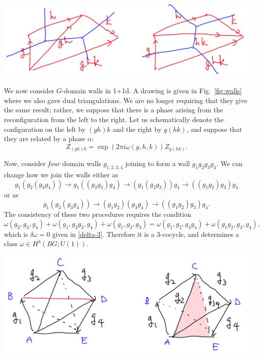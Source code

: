 \documentclass[12pt]{article}
\numberwithin{equation}{section}
\numberwithin{figure}{section}
\theoremstyle{remark}
\renewenvironment{figure}[1][]{
  \begin{originalfigure}[#1]
    \begin{mdframed}[linecolor=black!0,backgroundcolor=black!1]
}{
    \end{mdframed}
  \end{originalfigure}
}
\begin{document}
\begin{figure}
\centering
 \includegraphics[scale=.2]{walls.png} 
\caption{Reconfiguring $G$ domain walls in 1+1d. \label{fig:walls}}
\end{figure}

We now consider $G$-domain walls in 1+1d.
A drawing is given in Fig.~\ref{fig:walls} where we also gave dual triangulations.
We are no longer requiring that they give the same result;
rather, we suppose that there is a phase arising from the reconfiguration from the left to the right.
Let us schematically denote the configuration on the left by $(gh)k$ and the right by $g(hk)$,
and suppose that they are related by a phase $\alpha$: \begin{equation}
Z_{(gh)k} = \exp(2\pi i \omega(g,h,k)) Z_{g(hk)}.\label{omega-phase}
\end{equation}

Now, consider \emph{four} domain walls $g_{1,2,3,4}$ joining to form a wall $g_1g_2g_3g_4$.
We can change how we join the walls either as \begin{equation}
g_1(g_2(g_3g_4)) \to g_1((g_2g_3)g_4)\to(g_1(g_2g_3))g_4 \to ((g_1g_2)g_3)g_4
\end{equation} or as \begin{equation}
g_1(g_2(g_3g_4)) \to (g_1g_2)(g_3g_4) \to ((g_1g_2)g_3)g_4.
\end{equation}
The consistency of these two procedures requires the condition \begin{equation}
\omega(g_2,g_3,g_4)+\omega(g_1,g_2g_3,g_4)+ \omega(g_1,g_2,g_3) 
= \omega(g_1,g_2,g_3g_4) +\omega(g_1g_2,g_3,g_4),
\label{constraint}
\end{equation}
which is $\delta \omega=0$ given in \eqref{delta-3}.
Therefore it is a 3-cocycle, and determines a class $\omega\in H^3(BG;U(1))$.

\begin{figure}[h]
\centering
 \includegraphics[scale=.3]{2-3move.png} 
\caption{Two local configurations. Left: three tetrahedra;
right: two tetrahedra.  \label{fig:2-3move}}
\end{figure}
\end{document}
